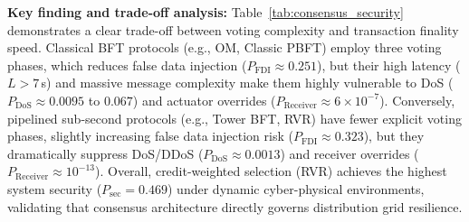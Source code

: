 \documentclass[10pt,twocolumn,journal]{IEEEtran}
\begin{document}
\textbf{Key finding and trade-off analysis:} Table~\ref{tab:consensus_security} demonstrates a clear trade-off between voting complexity and transaction finality speed. Classical BFT protocols (e.g., OM, Classic PBFT) employ three voting phases, which reduces false data injection ($P_{\mathrm{FDI}} \approx 0.251$), but their high latency ($L > 7$\,s) and massive message complexity make them highly vulnerable to DoS ($P_{\mathrm{DoS}} \approx 0.0095$ to $0.067$) and actuator overrides ($P_{\mathrm{Receiver}} \approx 6 \times 10^{-7}$). Conversely, pipelined sub-second protocols (e.g., Tower BFT, RVR) have fewer explicit voting phases, slightly increasing false data injection risk ($P_{\mathrm{FDI}} \approx 0.323$), but they dramatically suppress DoS/DDoS ($P_{\mathrm{DoS}} \approx 0.0013$) and receiver overrides ($P_{\mathrm{Receiver}} \approx 10^{-13}$). Overall, credit-weighted selection (RVR) achieves the highest system security ($P_{\mathrm{sec}} = 0.469$) under dynamic cyber-physical environments, validating that consensus architecture directly governs distribution grid resilience.
\end{document}
